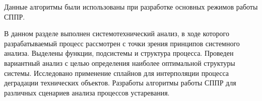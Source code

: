 Данные алгоритмы были использованы при разработке основных режимов работы СППР.

В данном разделе выполнен системотехнический анализ, в ходе которого разрабатываемый процесс рассмотрен с точки зрения принципов системного анализа. 
Выделены функции, подсистемы и структура процесса. 
Проведен вариантный анализ с целью определения наиболее оптимальной структуры системы. 
Исследовано применение сплайнов для интерполяции процесса деградации технических объектов.
Разработы алгоритмы работы СППР для различных сценариев анализа процессов устаревания.







